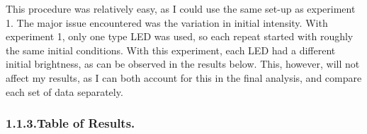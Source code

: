 \documentclass{article}
\begin{document}
\noindent{}This procedure was relatively easy, as I could use the same set-up as experiment 1. The major issue encountered was the variation in initial intensity. With experiment 1, only one type LED was used, so each repeat started with roughly the same initial conditions. With this experiment, each LED had a different initial brightness, as can be observed in the results below. This, however, will not affect my results, as I can both account for this in the final analysis, and compare each set of data separately.%

\subsubsection{1.1.3.\hspace*{0.5em}Table of Results.}\label{sec-table-of-results}%
\end{document}
